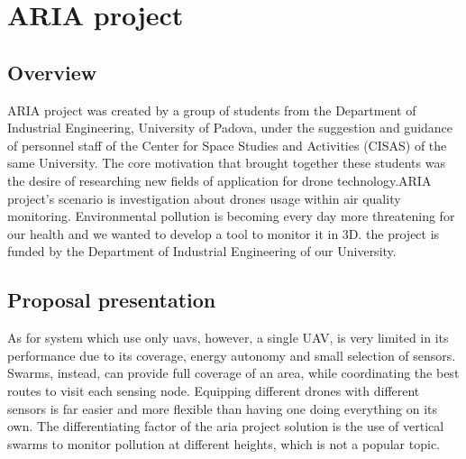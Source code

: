 \chapter{ARIA project}
\section{Overview}
ARIA project was created by a group of students from the Department of Industrial Engineering, University of Padova, under the suggestion and guidance of personnel staff of the Center for Space Studies and Activities (CISAS) of the same University. The core motivation that brought together these students was the desire of researching new fields of application for drone technology.ARIA project’s scenario is investigation about drones usage within air quality monitoring. Environmental pollution is becoming every day more threatening for our health and we wanted to develop a tool to monitor it in 3D. the project is funded by the Department of Industrial Engineering of our University.
\section{Proposal presentation}

As for system which use only \gls{uavs}, however, a single UAV, is very limited in its performance due to its coverage, energy autonomy and small selection of sensors.  Swarms, instead, can provide full coverage of an area, while coordinating the best routes to visit each sensing node. Equipping different drones with different sensors is far easier and more flexible than having one doing everything on its own. The differentiating factor of the \gls{aria} project solution is the use of vertical swarms to monitor pollution at different heights, which is not a popular topic.